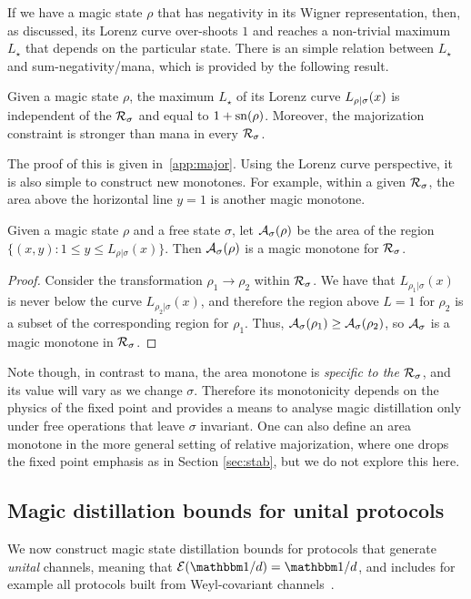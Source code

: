\documentclass[pra,
aps,
twocolumn,
superscriptaddress,
groupedaddress,
nofootinbib,
reprint
]{revtex4-1}
\begin{document}
If we have a magic state $\rho$ that has negativity in its Wigner representation, then, as discussed, its Lorenz curve over-shoots $1$ and reaches a non-trivial maximum $L_\star$ that depends on the particular state. There is an simple relation between $L_\star$ and sum-negativity/mana, which is provided by the following result. 
\begin{theorem}\label{lem:lcmax}
	Given a magic state $\rho$, the maximum $L_\star$ of its Lorenz curve ${L_{\rho|\sigma}}(x)$ is independent of the ${\mathcal R}_\sigma$ and equal to $1+{{\rm{sn}}(\rho)}$. Moreover, the majorization constraint is stronger than mana in every ${\mathcal R}_\sigma$.
\end{theorem}
The proof of this is given in~\cref{app:major}. Using the Lorenz curve perspective, it is also simple to construct new monotones. For example, within a given ${\mathcal R}_\sigma$, the area above the horizontal line $y = 1$ is another magic monotone.
\begin{lemma}
Given a magic state $\rho$ and a free state $\sigma$, let ${\mathcal A}_\sigma(\rho)$ be the area of the region $\{(x, y): 1 \leq y \leq L_{\rho | \sigma}(x)\}$. Then ${\mathcal A}_\sigma(\rho)$ is a magic monotone for ${\mathcal R}_\sigma$.
\end{lemma}
\begin{proof}
Consider the transformation $\rho_1 \rightarrow \rho_2$ within ${\mathcal R}_\sigma$. We have that $L_{\rho_1|\sigma}(x)$ is never below the curve $L_{\rho_2|\sigma}(x)$, and therefore the region above $L=1$ for $\rho_2$ is a subset of the corresponding region for $\rho_1$. Thus, ${\mathcal A}_\sigma(\rho_1) \geq {\mathcal A}_\sigma(\rho_2)$, so ${\mathcal A}_\sigma$ is a magic monotone in ${\mathcal R}_\sigma$.
\end{proof}
Note though, in contrast to mana, the area monotone is \emph{specific to the ${\mathcal R}_\sigma$}, and its value will vary as we change $\sigma$. Therefore its monotonicity depends on the physics of the fixed point and provides a means to analyse magic distillation only under free operations that leave $\sigma$ invariant. One can also define an area monotone in the more general setting of relative majorization, where one drops the fixed point emphasis as in Section \ref{sec:stab}, but we do not explore this here.

\subsection{Magic distillation bounds for unital protocols}
\label{sec:unital}

We now construct magic state distillation bounds for protocols that generate \emph{unital} channels, meaning that $\E(\I/d) = \I/d$, and includes for example all protocols built from Weyl-covariant channels~\cite{cit:gross3}. 
\end{document}

